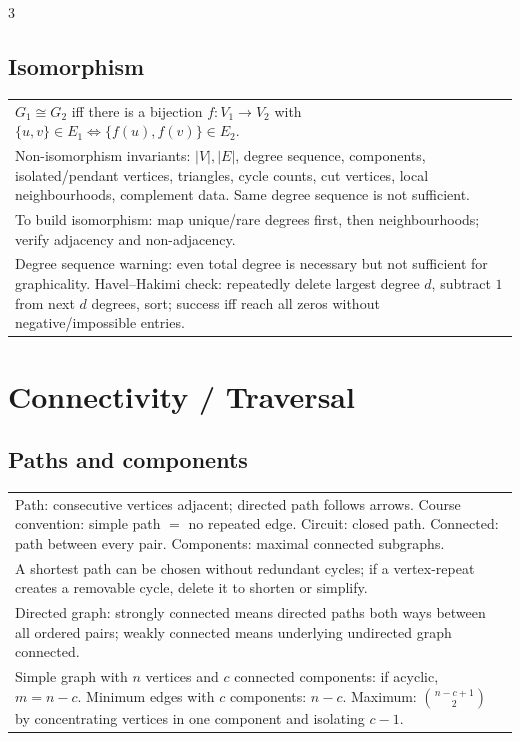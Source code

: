 \documentclass[10pt]{article}
\begin{document}
\begin{multicols*}{3}
\subsection*{Isomorphism}
\begin{tabular}{@{}p{}@{}}
\(G_1\cong G_2\) iff there is a bijection \(f:V_1\to V_2\) with \(\{u,v\}\in E_1\Longleftrightarrow\{f(u),f(v)\}\in E_2\).\\
Non-isomorphism invariants: \(|V|,|E|\), degree sequence, components, isolated/pendant vertices, triangles, cycle counts, cut vertices, local neighbourhoods, complement data. Same degree sequence is not sufficient.\\
To build isomorphism: map unique/rare degrees first, then neighbourhoods; verify adjacency and non-adjacency.\\
Degree sequence warning: even total degree is necessary but not sufficient for graphicality. Havel--Hakimi check: repeatedly delete largest degree \(d\), subtract \(1\) from next \(d\) degrees, sort; success iff reach all zeros without negative/impossible entries.\\
\end{tabular}

\section*{Connectivity / Traversal}
\subsection*{Paths and components}
\begin{tabular}{@{}p{}@{}}
Path: consecutive vertices adjacent; directed path follows arrows. Course convention: simple path \(=\) no repeated edge. Circuit: closed path. Connected: path between every pair. Components: maximal connected subgraphs.\\
A shortest path can be chosen without redundant cycles; if a vertex-repeat creates a removable cycle, delete it to shorten or simplify.\\
Directed graph: strongly connected means directed paths both ways between all ordered pairs; weakly connected means underlying undirected graph connected.\\
Simple graph with \(n\) vertices and \(c\) connected components: if acyclic, \(m=n-c\). Minimum edges with \(c\) components: \(n-c\). Maximum: \(\binom{n-c+1}{2}\) by concentrating vertices in one component and isolating \(c-1\).\\
\end{tabular}


\end{multicols*}
\end{document}

